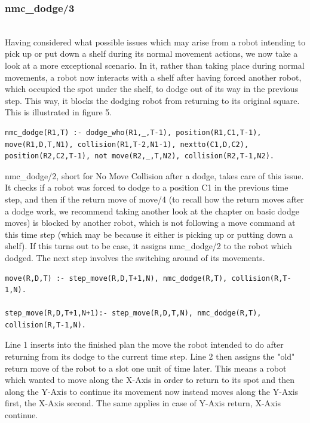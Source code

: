 \documentclass{llncs}
\begin{document}
\subsubsection{nmc\_dodge/3}\hfill\\
Having considered what possible issues which may arise from a robot intending to pick up or put down a shelf during its normal movement actions, we now take a look at a more exceptional scenario. In it, rather than taking place during normal movements, a robot now interacts with a shelf after having forced another robot, which occupied the spot under the shelf, to dodge out of its way in the previous step.  \newline This way, it blocks the dodging robot from returning to its original square. This is illustrated in figure 5.
\begin{lstlisting}[basicstyle=\fontsize{9}{11}\selectfont\ttfamily,frame=single,breaklines=true]
nmc_dodge(R1,T) :- dodge_who(R1,_,T-1), position(R1,C1,T-1), move(R1,D,T,N1), collision(R1,T-2,N1-1), nextto(C1,D,C2), position(R2,C2,T-1), not move(R2,_,T,N2), collision(R2,T-1,N2).
\end{lstlisting}
nmc\_dodge/2, short for No Move Collision after a dodge, takes care of this issue. 
It checks if a robot was forced to dodge to a position C1 in the previous time step, and then if the return move of move/4 (to recall how the return moves after a dodge work, we recommend taking another look at the chapter on basic dodge moves) is blocked by another robot, which is not following a move command at this time step (which may be because it either is picking up or putting down a shelf). If this turns out to be case, it assigns nmc\_dodge/2 to the robot which dodged.\newline
The next step involves the switching around of its movements.
\begin{lstlisting}[basicstyle=\fontsize{9}{11}\selectfont\ttfamily,frame=single,breaklines=true]
move(R,D,T) :- step_move(R,D,T+1,N), nmc_dodge(R,T), collision(R,T-1,N).

step_move(R,D,T+1,N+1):- step_move(R,D,T,N), nmc_dodge(R,T), collision(R,T-1,N).
\end{lstlisting}
Line 1 inserts into the finished plan the move the robot intended to do after returning from its dodge to the current time step. Line 2 then assigns the "old" return move of the robot to a slot one unit of time later. This means a robot which wanted to move along the X-Axis in order to return to its spot and then along the Y-Axis to continue its movement now instead moves along the Y-Axis first, the X-Axis second. The same applies in case of Y-Axis return, X-Axis continue.\newline
\end{document}
